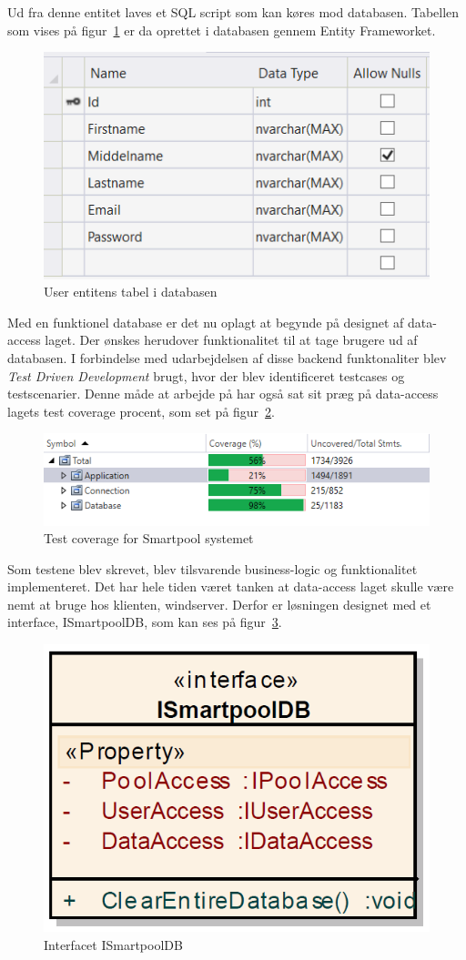 Ud fra denne entitet laves et SQL script som kan køres mod databasen. Tabellen som vises på figur~\ref{fig:usertable} er da oprettet i databasen gennem Entity Frameworket.

\begin{figure}[h]
\centering
\includegraphics[width=0.5\linewidth]{figs/database/usertable}
\caption{User entitens tabel i databasen}
\label{fig:usertable}
\end{figure}


Med en funktionel database er det nu oplagt at begynde på designet af data-access laget. Der ønskes herudover funktionalitet til at tage brugere ud af databasen. I forbindelse med udarbejdelsen af disse backend funktonaliter blev \textit{Test Driven Development} brugt, hvor der blev identificeret testcases og testscenarier. Denne måde at arbejde på har også sat sit præg på data-access lagets test coverage procent, som set på figur~\ref{fig:coverage}.

\begin{figure}[h]
\centering
\includegraphics[width=0.75\linewidth]{figs/database/coverage.png}
\caption{Test coverage for Smartpool systemet}
\label{fig:coverage}
\end{figure}

Som testene blev skrevet, blev tilsvarende business-logic og funktionalitet implementeret.
Det har hele tiden været tanken at data-access laget skulle være nemt at bruge hos klienten, \gls{windserver}. Derfor er løsningen designet med et interface, ISmartpoolDB, som kan ses på figur~\ref{fig:classISmartpoolDB}.

\begin{figure}[h]
\centering
\includegraphics[width=0.3\linewidth]{figs/database/classISmartpoolDB}
\caption{Interfacet ISmartpoolDB}
\label{fig:classISmartpoolDB}
\end{figure}

